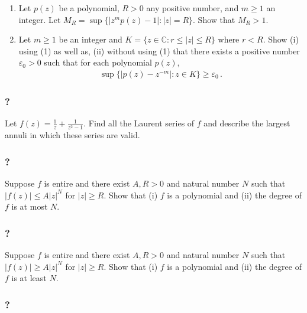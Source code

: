 \begin{enumerate}
\def\labelenumi{(\arabic{enumi})}
\item
  Let \(p(z)\) be a polynomial, \(R>0\) any positive number, and
  \(m \geq 1\) an integer. Let
  \(M_R = \sup \{ |z^{m} p(z) - 1|: |z| = R \}\). Show that \(M_R>1\).
\item
  Let \(m \geq 1\) be an integer and
  \(K = \{z \in {\mathbb C}: r \leq |z| \leq R \}\) where \(r<R\). Show
  (i) using (1) as well as, (ii) without using (1) that there exists a
  positive number \(\varepsilon_0>0\) such that for each polynomial
  \(p(z)\),
  \begin{align*}\sup \{|p(z) - z^{-m}|: z \in K  \} \geq \varepsilon_0 \, .\end{align*}
\end{enumerate}

\hypertarget{section-157}{%
\subsubsection{?}\label{section-157}}

Let \(\displaystyle f(z) = \frac{1}{z} + \frac{1}{z^2 -1}\). Find all
the Laurent series of \(f\) and describe the largest annuli in which
these series are valid.

\hypertarget{section-158}{%
\subsubsection{?}\label{section-158}}

Suppose \(f\) is entire and there exist \(A, R >0\) and natural number
\(N\) such that \(|f(z)| \leq A |z|^N\) for \(|z| \geq R\). Show that
(i) \(f\) is a polynomial and (ii) the degree of \(f\) is at most \(N\).

\hypertarget{section-159}{%
\subsubsection{?}\label{section-159}}

Suppose \(f\) is entire and there exist \(A, R >0\) and natural number
\(N\) such that \(|f(z)| \geq A |z|^N\) for \(|z| \geq R\). Show that
(i) \(f\) is a polynomial and (ii) the degree of \(f\) is at least
\(N\).

\hypertarget{section-160}{%
\subsubsection{?}\label{section-160}}

